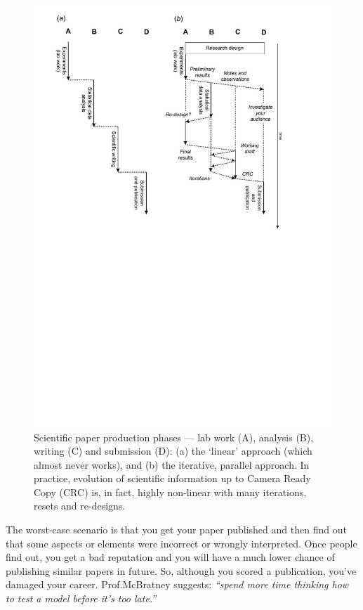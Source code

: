 \documentclass[graybox,envcountchap,sectrefs,UStrade]{svmono}
\begin{document}
\begin{figure}[!htb]
\begin{center}
  \includegraphics[width=\textwidth]{Fig_paper_production_flow.pdf}
\caption{Scientific paper production phases --- lab work (A), analysis (B), writing (C) and submission (D): (a) the `linear' approach (which almost never works), and (b) the iterative, parallel approach. In practice, evolution of scientific information up to Camera Ready Copy (CRC) is, in fact, highly non-linear with many iterations, resets and re-designs.} \label{Fig:paper_production_flow}
\end{center}
\end{figure}

The worst-case scenario is that you get your paper published and then find out that some aspects or elements were incorrect or wrongly interpreted. Once people find out, you get a bad reputation and you will have a much lower chance of publishing similar papers in future. So, although you scored a publication, you've damaged your career. Prof.\@ McBratney suggests: \emph{``spend more time thinking how to test a model before it's too late.''} \par
\end{document}
